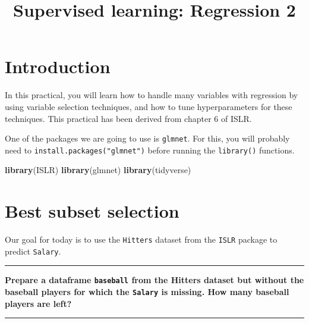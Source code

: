 \documentclass[12pt,]{article}
\title{Supervised learning: Regression 2}
\author{}
\date{}
\newenvironment{Shaded}{\begin{snugshade}}{\end{snugshade}}
\newcommand{\KeywordTok}[1]{\textcolor[rgb]{0.13,0.29,0.53}{\textbf{#1}}}
\newcommand{\NormalTok}[1]{#1}
\newcommand{\OperatorTok}[1]{\textcolor[rgb]{0.81,0.36,0.00}{\textbf{#1}}}
\newcommand{\StringTok}[1]{\textcolor[rgb]{0.31,0.60,0.02}{#1}}
\begin{document}
\maketitle

{
\hypersetup{linkcolor=black}
\setcounter{tocdepth}{1}
\tableofcontents
}
\hypertarget{introduction}{%
\section{Introduction}\label{introduction}}

In this practical, you will learn how to handle many variables with
regression by using variable selection techniques, and how to tune
hyperparameters for these techniques. This practical has been derived
from chapter 6 of ISLR.

One of the packages we are going to use is \texttt{glmnet}. For this,
you will probably need to \texttt{install.packages("glmnet")} before
running the \texttt{library()} functions.

\begin{Shaded}
\begin{Highlighting}[]
\KeywordTok{library}\NormalTok{(ISLR)}
\KeywordTok{library}\NormalTok{(glmnet)}
\KeywordTok{library}\NormalTok{(tidyverse)}
\end{Highlighting}
\end{Shaded}

\hypertarget{best-subset-selection}{%
\section{Best subset selection}\label{best-subset-selection}}

Our goal for today is to use the \texttt{Hitters} dataset from the
\texttt{ISLR} package to predict \texttt{Salary}.

\begin{center}\rule{0.5\linewidth}{\linethickness}\end{center}

\textbf{Prepare a dataframe \texttt{baseball} from the Hitters dataset
but without the baseball players for which the \texttt{Salary} is
missing. How many baseball players are left?}

\begin{center}\rule{0.5\linewidth}{\linethickness}\end{center}

\begin{Shaded}
\end{Shaded}
\end{document}
